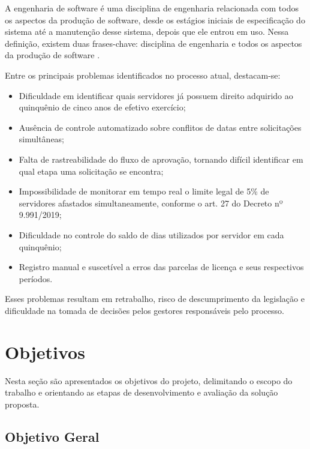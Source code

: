 \begin{citacao}
A engenharia de software é uma disciplina de engenharia relacionada com todos os aspectos da produção de software, desde os estágios iniciais de especificação do sistema até a manutenção desse sistema, depois que ele entrou em uso. Nessa definição, existem duas frases-chave: disciplina de engenharia e todos os aspectos da produção de software \cite[p.~39]{pressman_engenharia}.
\end{citacao}

Entre os principais problemas identificados no processo atual, destacam-se:

\begin{itemize}
    \item Dificuldade em identificar quais servidores já possuem direito adquirido ao quinquênio de cinco anos de efetivo exercício;
    \item Ausência de controle automatizado sobre conflitos de datas entre solicitações simultâneas;
    \item Falta de rastreabilidade do fluxo de aprovação, tornando difícil identificar em qual etapa uma solicitação se encontra;
    \item Impossibilidade de monitorar em tempo real o limite legal de 5\% de servidores afastados simultaneamente, conforme o art. 27 do Decreto nº 9.991/2019;
    \item Dificuldade no controle do saldo de dias utilizados por servidor em cada quinquênio;
    \item Registro manual e suscetível a erros das parcelas de licença e seus respectivos períodos.
\end{itemize}

Esses problemas resultam em retrabalho, risco de descumprimento da legislação e dificuldade na tomada de decisões pelos gestores responsáveis pelo processo.

\section{Objetivos}

Nesta seção são apresentados os objetivos do projeto, delimitando o escopo do trabalho e orientando as etapas de desenvolvimento e avaliação da solução proposta.

\subsection{Objetivo Geral}

